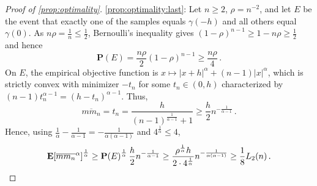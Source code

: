 \documentclass{article}
\newcommand{\lab}{\left[} %
\newcommand{\rab}{\right]} %
\newcommand{\ab}[1]{\lab #1 \rab} %
\newcommand{\abOf}[1]{\!\ab{#1}} %
\newcommand{\lb}{\left(} %
\newcommand{\rb}{\right)} %
\newcommand{\br}[1]{\lb #1 \rb} %
\newcommand{\brOf}[1]{\!\br{#1}} %
\newcommand{\absof}[1]{\vert #1 \vert} %
\renewcommand{\Pr}{\mathbf{P}} %
\newcommand{\PrOf}[1]{\Pr\brOf{#1}}
\newcommand{\E}{\mathbf{E}} %
\newcommand{\EOf}[1]{\E\abOf{#1}}
\newcommand{\eqfs}{\,.}
\newcommand{\ol}[2]{\overline{#1#2}}
\begin{document}
\begin{proof}[Proof of \cref{prop:optimality}]
    \ref{prop:optimality:last}:
    Let $n\geq2$, $\rho=n^{-2}$, and let $E$ be the event that exactly one of the samples equals $\gamma(-h)$ and all others equal $\gamma(0)$. As $n\rho = \frac1n \leq \frac12$, Bernoulli's inequality gives $(1-\rho)^{n-1} \geq 1-n\rho \geq \frac12$ and hence
    \begin{equation}
        \PrOf{E} = \frac{n\rho}{2}\br{1-\rho}^{n-1} \geq \frac{n\rho}{4}
        \eqfs
    \end{equation}
    On $E$, the empirical objective function is $x \mapsto \absof{x+h}^\alpha + (n-1)\absof{x}^\alpha$, which is strictly convex with minimizer $-t_n$ for some $t_n \in (0,h)$ characterized by $(n-1) t_n^{\alpha-1} = (h-t_n)^{\alpha-1}$. Thus,
    \begin{equation}
        \ol m{m_n}
        =
        t_n
        =
        \frac{h}{(n-1)^{\frac1{\alpha-1}}+1}
        \geq
        \frac{h}{2}  n^{-\frac1{\alpha-1}}
        \eqfs
    \end{equation}
    Hence, using $\frac1\alpha - \frac1{\alpha-1} = -\frac1{\alpha(\alpha-1)}$ and $4^{\frac1\alpha}\leq4$,
    \begin{equation}
        \EOf{\ol m{m_n}^\alpha}^{\frac1\alpha}
        \geq
        \PrOf{E}^{\frac1\alpha}  \frac{h}{2}  n^{-\frac1{\alpha-1}}
        \geq
        \frac{\rho^{\frac1\alpha}  h}{2 \cdot 4^{\frac1\alpha}}  n^{-\frac1{\alpha(\alpha-1)}}
        \geq
        \frac18 L_2(n)
        \eqfs
        \qedhere
    \end{equation}
\end{proof}
%
\end{document}
